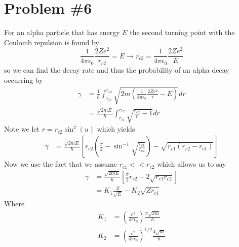 \documentclass[11pt]{article}
\numberwithin{equation}{section}
\begin{document}
\section{Problem \#6}
For an alpha particle that has energy $E$ the second turning point with the Coulomb repulsion is found by
$$\frac{1}{4\pi\epsilon_0}\frac{2Ze^2}{r_{c2}} = E \rightarrow r_{c2} = \frac{1}{4\pi\epsilon_0}\frac{2Ze^2}{E}$$
so we can find the decay rate and thus the probability of an alpha decay occurring by
\begin{align*}
\gamma &= \frac{1}{\hbar}\int_{r_{c1}}^{r_{c2}}\sqrt{2m\left(\frac{1}{4\pi\epsilon_0}\frac{2Ze^2}{r} - E\right)}dr\\
&= \frac{\sqrt{2mE}}{\hbar}\int_{r_{c1}}^{r_{c2}}\sqrt{\frac{r_{c2}}{r}-1}dr
\end{align*}
Note we let $r=r_{c2}\sin^2(u)$ which yields
\begin{align*}
\gamma &= \frac{\sqrt{2mE}}{\hbar}\left[r_{c2}\left(\frac{\pi}{2}-\sin^{-1}\sqrt{\frac{r_{c1}}{r_{c2}}}\right) - \sqrt{r_{c1}(r_{c2}-r_{c1})}\right]
\end{align*}
Now we use the fact that we assume $r_{c1} << r_{c2}$ which allows us to say
\begin{align*}
\gamma &= \frac{\sqrt{2mE}}{\hbar}\left[\frac{\pi}{2}r_{c2}-2\sqrt{r_{c1}r_{c2}}\right]\\
&= K_1\frac{Z}{\sqrt{E}} - K_2\sqrt{Zr_{c1}}
\end{align*}
Where
\begin{align*}
K_1 &= \left(\frac{e^2}{4\pi\epsilon_0}\right)\frac{\pi\sqrt{2m}}{\hbar}\\
K_2 &= \left(\frac{e^2}{4\pi\epsilon_0}\right)^{1/2}\frac{4\sqrt{m}}{\hbar}
\end{align*}
\end{document}
